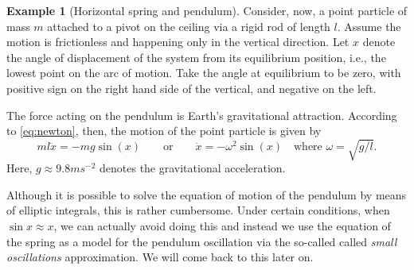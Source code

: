 \documentclass[english,fontsize=11pt,paper=b5]{scrbook}
\theoremstyle{definition}
\newtheorem{example}{Example}[chapter]
\begin{document}
\begin{example}[Horizontal spring and pendulum]
    Consider, now, a point particle of mass $m$ attached to a pivot on the ceiling via a rigid rod of length $l$.
    Assume the motion is frictionless and happening only in the vertical direction.
    Let $x$ denote the angle of displacement of the system from its equilibrium position, i.e., the lowest point on the arc of motion. Take the angle at equilibrium to be zero, with positive sign on the right hand side of the vertical, and negative on the left.

    The force acting on the pendulum is Earth's gravitational attraction. According to \eqref{eq:newton}, then, the motion of the point particle is given by
    \begin{equation}
      m l \ddot{x} = - m g \sin(x) \qquad\mbox{or}\qquad \ddot{x} = - \omega^2 \sin(x) \quad\mbox{where } \omega = \sqrt{g/l}.
    \end{equation}
    Here, $g \approx 9.8 m s^{-2}$ denotes the gravitational acceleration.

    Although it is possible to solve the equation of motion of the pendulum by means of elliptic integrals, this is rather cumbersome.
    Under certain conditions, when $\sin x \approx x$, we can actually avoid doing this and instead we use the equation of the spring as a model for the pendulum oscillation via the so-called called \emph{small oscillations} approximation.
    We will come back to this later on.
  \end{example}
\end{document}
